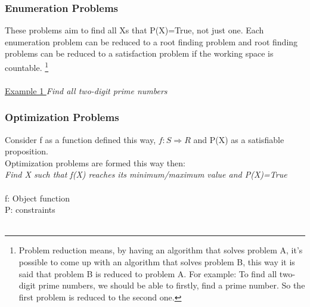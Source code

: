 \documentclass[twocolumn,a4paper, 10pt]{article}
\begin{document}
            \subsubsection{Enumeration Problems}
                    These problems aim to find all Xs that P(X)=True, not just one. Each enumeration problem can be 
                    reduced to a root finding problem and root finding problems can be reduced to 
                    a satisfaction problem if the working space is countable. \footnote{Problem reduction means, by having an algorithm that solves problem A,
                    it's possible to come up with an algorithm that solves problem B, this way it is said that problem B is reduced to problem A.
                    For example: To find all two-digit prime numbers, we should be able to firstly, find a prime number. So the first problem is 
                    reduced to the second one.} \\ \\
                    \underline{Example 1 }
                        \emph{Find all two-digit prime numbers}
            \subsubsection{Optimization Problems}
                    Consider f as a function defined this way,
                    \begin{math}
                         f:S \Rightarrow R
                    \end{math} and P(X) as a satisfiable proposition. \\ 
                    Optimization problems are formed this way then: \\ 
                    \emph{Find X such that f(X) reaches its minimum/maximum value and P(X)=True} \\ \\
                    f: Object function \\
                    P: constraints \\ \\
\end{document}
